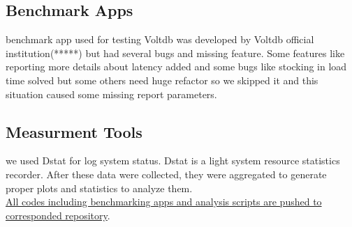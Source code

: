 \documentclass[main.tex]{subfiles}
\begin{document}
    \subsection{Benchmark Apps}
    benchmark app used for testing Voltdb was developed by Voltdb official institution(*****) but had several bugs and missing feature. Some features like reporting more details about latency added and some bugs like stocking in load time solved but some others need huge refactor so we skipped it and this situation caused some missing report parameters.

    \subsection{Measurment Tools}
    we used Dstat for log system status. Dstat is a light system resource statistics recorder. After these data were collected, they were aggregated to generate proper plots and statistics to analyze them.\\

    \href{https://github.com/erfan-mehraban/tpc-benchmark}{All codes including benchmarking apps and analysis scripts are pushed to corresponded repository}.\\
\end{document}

